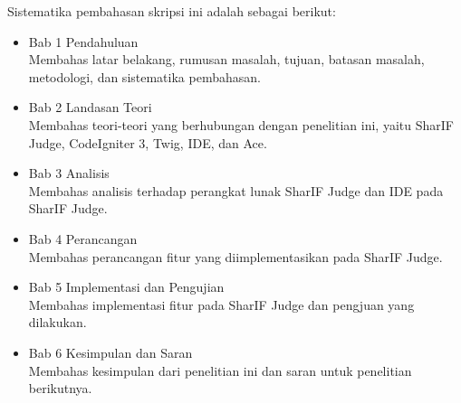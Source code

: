 Sistematika pembahasan skripsi ini adalah sebagai berikut:
    \begin{itemize}
        \item Bab 1 Pendahuluan \\
        Membahas latar belakang, rumusan masalah, tujuan, batasan masalah, metodologi, dan sistematika pembahasan.
        \item Bab 2 Landasan Teori \\ 
        Membahas teori-teori yang berhubungan dengan penelitian ini, yaitu SharIF Judge, CodeIgniter 3, Twig, IDE, dan Ace.
        \item Bab 3 Analisis \\ 
        Membahas analisis terhadap perangkat lunak SharIF Judge dan IDE pada SharIF Judge.
        \item Bab 4 Perancangan \\ 
        Membahas perancangan fitur yang diimplementasikan pada SharIF Judge.
        \item Bab 5 Implementasi dan Pengujian \\ 
        Membahas implementasi fitur pada SharIF Judge dan pengjuan yang dilakukan.
        \item Bab 6 Kesimpulan dan Saran \\ 
        Membahas kesimpulan dari penelitian ini dan saran untuk penelitian berikutnya.
    \end{itemize}